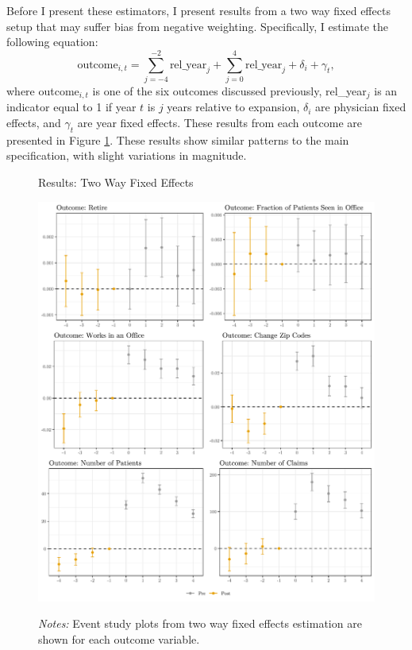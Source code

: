 \documentclass[12pt]{article}
\begin{document}
Before I present these estimators, I present results from a two way fixed effects setup that may suffer bias from negative weighting. Specifically, I estimate the following equation:
$$\text{outcome}_{i,t}=\sum_{j=-4}^{-2} \text{rel\_year}_{j} + \sum_{j=0}^{4} \text{rel\_year}_{j} + \delta_i + \gamma_t,$$
where outcome$_{i,t}$ is one of the six outcomes discussed previously, rel\_year$_j$ is an indicator equal to 1 if year $t$ is $j$ years relative to expansion, $\delta_i$ are physician fixed effects, and $\gamma_t$ are year fixed effects.
These results from each outcome are presented in Figure \ref{fig:twfe}. These results show similar patterns to the main specification, with slight variations in magnitude. 

\begin{figure}
    \centering
    \captionsetup{width=.8\linewidth}
    \caption{Results: Two Way Fixed Effects}
    \includegraphics[scale=.8]{Objects/twfe_plot.pdf}
    \label{fig:twfe}
    \vspace{2mm}
    \caption*{\footnotesize{\textit{Notes:} Event study plots from two way fixed effects estimation are shown for each outcome variable.}}
\end{figure}
\end{document}
